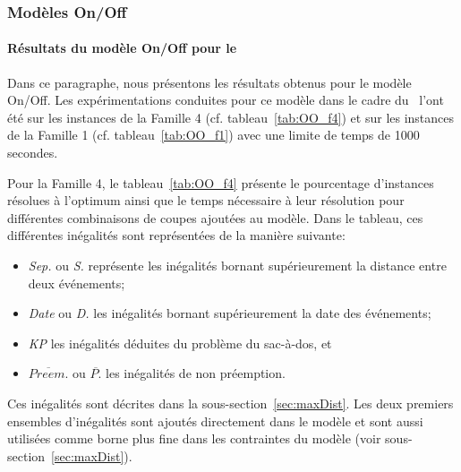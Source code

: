 \subsubsection{Modèles On/Off}

\paragraph{Résultats du modèle On/Off pour le \CECSP}
Dans ce paragraphe, nous présentons les résultats obtenus pour le
modèle On/Off. Les expérimentations conduites pour ce modèle dans le
cadre du \CECSP~l'ont été
sur les instances de la Famille 4 (cf. tableau~\ref{tab:OO_f4}) et sur les
instances de la Famille 1 (cf. tableau~\ref{tab:OO_f1}) avec une
limite de temps de 1000 secondes.  

Pour la Famille 4, le tableau~\ref{tab:OO_f4} présente le pourcentage
d'instances résolues à l'optimum ainsi que le temps nécessaire à leur 
résolution pour différentes combinaisons de coupes ajoutées au
modèle. Dans le tableau, ces différentes inégalités sont représentées
de la manière suivante: 
\begin{itemize}
\item {\it Sep.} ou {\it S.} représente les inégalités
 bornant supérieurement la distance entre deux événements;
\item {\it Date} ou {\it D.} les inégalités bornant supérieurement la
  date des événements;
\item {\it KP} les inégalités déduites du problème du sac-à-dos, et  
\item {\it $\overline{Preem.}$} ou {\it $\overline{P.}$} les
  inégalités de non préemption.
\end{itemize}
Ces inégalités sont décrites dans la sous-section~\ref{sec:maxDist}. 
 Les deux premiers ensembles d'inégalités sont ajoutés directement
 dans le modèle et sont aussi utilisées comme borne plus fine dans les
 contraintes du modèle (voir sous-section~\ref{sec:maxDist}).


